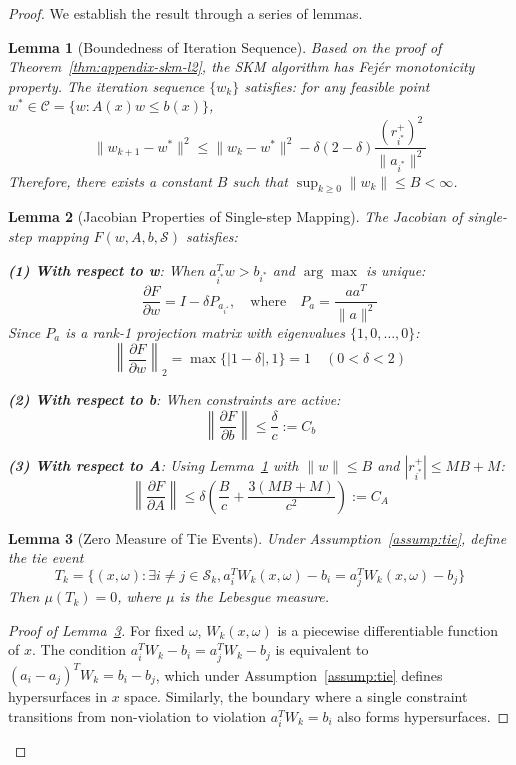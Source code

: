 \documentclass[10pt,a4paper]{amsart}
\newtheorem{lemma}{Lemma}
\begin{document}
\begin{proof}
We establish the result through a series of lemmas.

\begin{lemma}[Boundedness of Iteration Sequence]
\label{lem:boundedness}
Based on the proof of Theorem~\ref{thm:appendix-skm-l2}, the SKM algorithm has Fejér monotonicity property. The iteration sequence $\{w_k\}$ satisfies: for any feasible point $w^* \in \mathcal{C} = \{w : A(x)w \leq b(x)\}$,
$$\|w_{k+1} - w^*\|^2 \leq \|w_k - w^*\|^2 - \delta(2-\delta)\frac{(r_{i^*}^+)^2}{\|a_{i^*}\|^2}$$
Therefore, there exists a constant $B$ such that $\sup_{k \geq 0} \|w_k\| \leq B < \infty$.
\end{lemma}

\begin{lemma}[Jacobian Properties of Single-step Mapping]
\label{lem:jacobian}
The Jacobian of single-step mapping $F(w,A,b,\mathcal{S})$ satisfies:

\textbf{(1) With respect to w}: When $a_{i^*}^T w > b_{i^*}$ and $\arg\max$ is unique:
$$\frac{\partial F}{\partial w} = I - \delta P_{a_{i^*}}, \quad \text{where} \quad P_a = \frac{aa^T}{\|a\|^2}$$
Since $P_a$ is a rank-1 projection matrix with eigenvalues $\{1, 0, \ldots, 0\}$:
$$\left\|\frac{\partial F}{\partial w}\right\|_2 = \max\{|1-\delta|, 1\} = 1 \quad (0 < \delta < 2)$$

\textbf{(2) With respect to b}: When constraints are active:
$$\left\|\frac{\partial F}{\partial b}\right\| \leq \frac{\delta}{c} := C_b$$

\textbf{(3) With respect to A}: Using Lemma~\ref{lem:boundedness} with $\|w\| \leq B$ and $|r_{i^*}^+| \leq MB + M$:
$$\left\|\frac{\partial F}{\partial A}\right\| \leq \delta \left( \frac{B}{c} + \frac{3(MB + M)}{c^2} \right) := C_A$$
\end{lemma}

\begin{lemma}[Zero Measure of Tie Events]
\label{lem:tie}
Under Assumption~\ref{assump:tie}, define the tie event
$$T_k = \{(x,\omega): \exists i \neq j \in \mathcal{S}_k, a_i^T W_k(x,\omega) - b_i = a_j^T W_k(x,\omega) - b_j\}$$
Then $\mu(T_k) = 0$, where $\mu$ is the Lebesgue measure.
\end{lemma}

\begin{proof}[Proof of Lemma~\ref{lem:tie}]
For fixed $\omega$, $W_k(x,\omega)$ is a piecewise differentiable function of $x$. The condition $a_i^T W_k - b_i = a_j^T W_k - b_j$ is equivalent to $(a_i - a_j)^T W_k = b_i - b_j$, which under Assumption~\ref{assump:tie} defines hypersurfaces in $x$ space. Similarly, the boundary where a single constraint transitions from non-violation to violation $a_i^T W_k = b_i$ also forms hypersurfaces.


\end{proof}
\end{proof}
\end{document}
